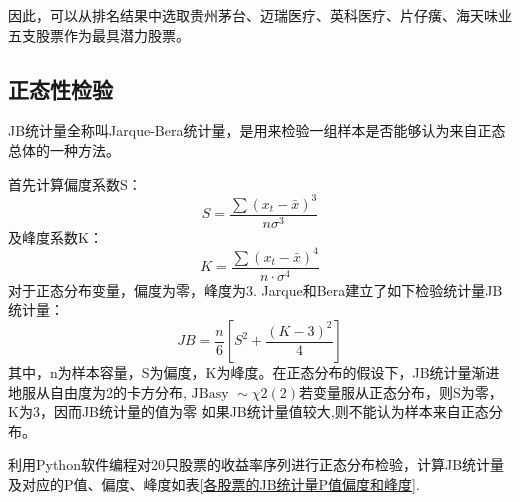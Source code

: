 \documentclass[withoutpreface,bwprint]{cumcmthesis} %
\begin{document}
因此，可以从排名结果中选取贵州茅台、迈瑞医疗、英科医疗、片仔癀、海天味业五支股票作为最具潜力股票。
	
	\subsection{正态性检验}	
JB统计量全称叫Jarque-Bera统计量，是用来检验一组样本是否能够认为来自正态总体的一种方法。

首先计算偏度系数S：
$$
S=\frac{\sum\left(x_{t}-\bar{x}\right)^{3}}{n \sigma^{3}}
$$
及峰度系数K：
$$
K=\frac{\sum\left(x_{t}-\bar{x}\right)^{4}}{n \cdot \sigma^{4}}
$$
对于正态分布变量，偏度为零，峰度为3.
Jarque和Bera建立了如下检验统计量JB统计量：
$$
J B=\frac{n}{6}\left[S^{2}+\frac{(K-3)^{2}}{4}\right]
$$
其中，n为样本容量，S为偏度，K为峰度。在正态分布的假设下，JB统计量渐进地服从自由度为2的卡方分布,$\text { JBasy } \sim \chi 2(2)$若变量服从正态分布，则S为零，K为3，因而JB统计量的值为零
如果JB统计量值较大,则不能认为样本来自正态分布。

利用Python软件编程对20只股票的收益率序列进行正态分布检验，计算JB统计量及对应的P值、偏度、峰度如表\ref{各股票的JB统计量P值偏度和峰度}.
\end{document}
